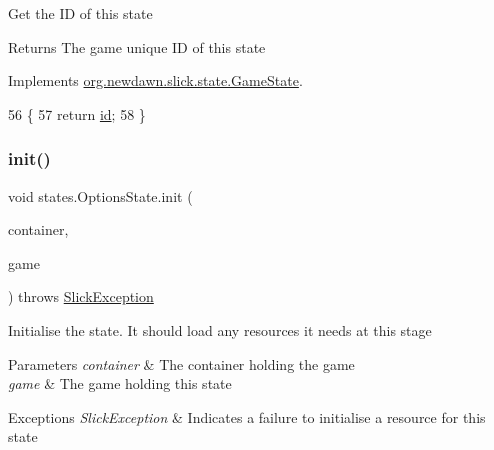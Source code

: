Get the ID of this state

\begin{DoxyReturn}{Returns}
The game unique ID of this state 
\end{DoxyReturn}


Implements \mbox{\hyperlink{interfaceorg_1_1newdawn_1_1slick_1_1state_1_1_game_state_a54f2bc6a91feaf0614a5ef19f1d03313}{org.\+newdawn.\+slick.\+state.\+Game\+State}}.


\begin{DoxyCode}
56                        \{
57         \textcolor{keywordflow}{return} \mbox{\hyperlink{classstates_1_1_options_state_a55f5f77b21511b9bb3a1c306bf81c091}{id}};
58     \}
\end{DoxyCode}
\mbox{\label{classstates_1_1_options_state_a173809c3faa8e5ba70be2b5c3b374899}} 
\subsubsection{\texorpdfstring{init()}{init()}}
{\footnotesize\ttfamily void states.\+Options\+State.\+init (\begin{DoxyParamCaption}\item[{final \mbox{\hyperlink{classorg_1_1newdawn_1_1slick_1_1_game_container}{Game\+Container}}}]{container,  }\item[{final \mbox{\hyperlink{classorg_1_1newdawn_1_1slick_1_1state_1_1_state_based_game}{State\+Based\+Game}}}]{game }\end{DoxyParamCaption}) throws \mbox{\hyperlink{classorg_1_1newdawn_1_1slick_1_1_slick_exception}{Slick\+Exception}}\hspace{0.3cm}{\ttfamily [inline]}}

Initialise the state. It should load any resources it needs at this stage


\begin{DoxyParams}{Parameters}
{\em container} & The container holding the game \\
\hline
{\em game} & The game holding this state \\
\hline
\end{DoxyParams}

\begin{DoxyExceptions}{Exceptions}
{\em Slick\+Exception} & Indicates a failure to initialise a resource for this state \\
\hline
\end{DoxyExceptions}


